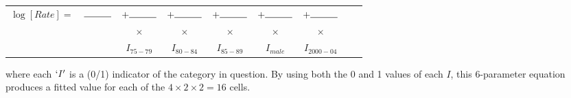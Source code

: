 \documentclass[10pt]{beamer}\usepackage[]{graphicx}\usepackage[]{color}
\begin{document}
\begin{frame}
\begin{tabular}{c c c c c c c c c}
	$\log[Rate] =$ &$\rule{1cm}{0.15mm}$& $+  \rule{1cm}{0.15mm}$ & $+   \rule{1cm}{0.15mm}$ & $+   \rule{1cm}{0.15mm}$ & $+   \rule{1cm}{0.15mm} $ & $+ \rule{1cm}{0.15mm}$ \\
	& &  $\times$  &  $\times$ &  $\times$ & $\times$ & $\times$ & \\
	& &  $I_{75-79}$ & $I_{80-84}$ & $I_{85-89}$ & $I_{male}$ & $I_{2000-04}$ \\
\end{tabular}

where each $`I'$ is a (0/1) indicator of the category in question. By using both the 0 and 1 values of each $I$, this 6-parameter equation  produces a fitted value for each of the $4\times2\times2=16$ cells.

\end{frame}
\end{document}
